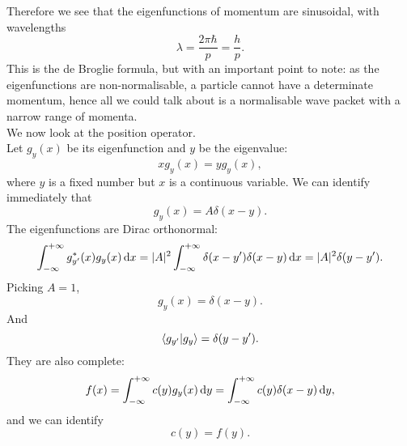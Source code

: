Therefore we see that the eigenfunctions of momentum are sinusoidal, with wavelengths 
\begin{equation}
\lambda=\frac{2\pi\hbar}{p}=\frac{h}{p}.
\end{equation}
This is the de Broglie formula, but with an important point to note: 
as the eigenfunctions are non-normalisable, a particle cannot have a determinate 
momentum, hence all we could talk about is a normalisable wave packet 
with a narrow range of momenta. \\
We now look at the position operator. \\
Let $g_y(x)$ be its eigenfunction and $y$ be the eigenvalue:
\begin{equation}
xg_y(x)=yg_y(x), 
\end{equation}
where $y$ is a fixed number but $x$ is a continuous variable. We can identify immediately that 
\begin{equation}
g_y(x)=A\delta(x-y). 
\end{equation}
The eigenfunctions are Dirac orthonormal:
\begin{equation}
\intinf g_{y'}^*(x)g_y(x)\dx=|A|^2\intinf\delta(x-y')\delta(x-y)\dx=|A|^2\delta(y-y').
\end{equation}
Picking $A=1$, 
\begin{equation}
g_y(x)=\delta(x-y).
\end{equation}
And 
\begin{equation}
\langle g_{y'}|g_y\rangle=\delta(y-y').
\end{equation}
They are also complete:
\begin{equation}
f(x)=\intinf c(y)g_y(x)\dif y=\intinf c(y)\delta(x-y)\dif y,
\end{equation}
and we can identify
\begin{equation}
c(y)=f(y).
\end{equation}
